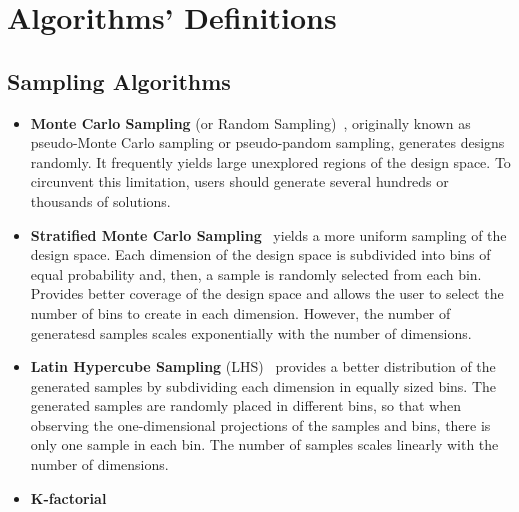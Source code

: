 \appendix\chapter{Algorithms' Definitions}
\label{appendix:AlgorithmsDefinitions}


\section{Sampling Algorithms} 
\begin{itemize}
\item \textbf{Monte Carlo Sampling} (or Random Sampling)~\cite{Giunta2003DOE}, originally known as pseudo-Monte Carlo sampling or pseudo-pandom sampling, generates designs randomly. It frequently yields large unexplored regions of the design space. To circunvent this limitation, users should generate several hundreds or thousands of solutions.

\item \textbf{Stratified Monte Carlo Sampling}~\cite{Giunta2003DOE} yields a more uniform sampling of the design space. Each dimension of the design space is subdivided into bins of equal probability and, then, a sample is randomly selected from each bin. Provides better coverage of the design space and allows the user to select the number of bins to create in each dimension. However, the number of generatesd samples scales exponentially with the number of dimensions.

\item \textbf{Latin Hypercube Sampling} (LHS)~\cite{Giunta2003DOE} provides a better distribution of the generated samples by subdividing each dimension in equally sized bins. The generated samples are randomly placed in different bins, so that when observing the one-dimensional projections of the samples and bins, there is only one sample in each bin. The number of samples scales linearly with the number of dimensions.

\item \textbf{K-factorial}
\end{itemize}



